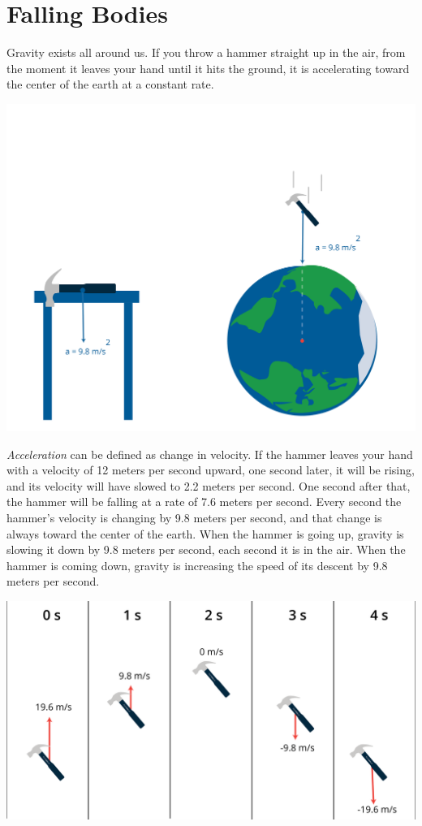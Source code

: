 \chapter{Falling Bodies}

Gravity exists all around us. If you throw a hammer straight up in the air, from
the moment it leaves your hand until it hits the ground, it is
accelerating toward the center of the earth at a constant rate.

\includegraphics[width=1\textwidth]{hammerFall.png}

\emph{Acceleration} can be defined as change in velocity. If the hammer leaves your
hand with a velocity of 12 meters per second upward, one second later,
it will be rising, and its velocity will have slowed to 2.2 meters per
second. One second after that, the hammer will be falling at a rate of
7.6 meters per second. Every second the hammer's velocity is changing by
9.8 meters per second, and that change is always toward the center of
the earth. When the hammer is going up, gravity is slowing it down by
9.8 meters per second, each second it is in the air.  When the hammer is coming down,
gravity is increasing the speed of its descent by 9.8 meters per second.


\includegraphics[width=.8\textwidth]{hammerTime.png}

